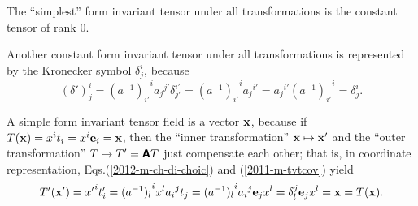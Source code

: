 {
\color{blue}
\bexample

The ``simplest'' form invariant tensor under all transformations is the constant tensor of rank $0$.

Another constant form invariant tensor  under all transformations is represented by the Kronecker symbol $\delta^i_j$,
because
\begin{equation}
{(\delta ')}^i_j= {(a^{-1})_{i'}}^i {a_j}^{j'}\delta^{i'}_{j'}={(a^{-1})_{i'}}^i {a_j}^{i'}= {a_j}^{i'}{(a^{-1})_{i'}}^i=\delta^i_j
.
\end{equation}

A simple form invariant tensor field is a vector ${\bf x}$,
because if $T({\bf x})= x^i t_i= x^i {\bf e}_i={\bf x}$, then
the ``inner transformation''
${\bf x} \mapsto  {\bf x}'$
and the ``outer transformation''
$T \mapsto  T'= \textsf{\textbf{A}}T$
just compensate each other; that is, in coordinate representation, Eqs.(\ref{2012-m-ch-di-choic}) and (\ref{2011-m-tvtcov}) yield
\begin{equation}
T'({\bf x}')= {x'}^i t'_i= {(a^{-1})_l}^i x^l   {a_i}^j t_j = {(a^{-1})_l}^i  {a_i}^j {\bf e}_j  x^l
= \delta_l^j {\bf e}_j  x^l = {\bf x} = T({\bf x}).
\end{equation}



}

